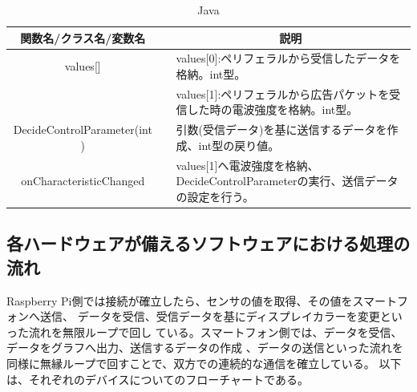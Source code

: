\documentclass[dvipdfmx,autodetect-engine,titlepage]{jsarticle}
\begin{document}
    \begin{table}[h]
        \centering
        \small
        \caption{Java}
        \begin{tabular}{cll}
        \hline
        関数名/クラス名/変数名                 &  & \multicolumn{1}{c}{説明}                                       \\ \hline\hline
        values{[}{]}                 &  & values{[}0{]}:ペリフェラルから受信したデータを格納。int型。                       \\ \hline
                                     &  & values{[}1{]}:ペリフェラルから広告パケットを受信した時の電波強度を格納。int型。             \\ \hline
        DecideControlParameter(int ) &  & 引数(受信データ)を基に送信するデータを作成、int型の戻り値。                             \\ \hline
        onCharacteristicChanged      &  & values{[}1{]}へ電波強度を格納、DecideControlParameterの実行、送信データの設定を行う。 \\ \hline
        \end{tabular}
        \end{table}

  \subsection{各ハードウェアが備えるソフトウェアにおける処理の流れ}
  Raspberry Pi側では接続が確立したら、センサの値を取得、その値をスマートフォンへ送信、
  データを受信、受信データを基にディスプレイカラーを変更といった流れを無限ループで回し
  ている。スマートフォン側では、データを受信、データをグラフへ出力、送信するデータの作成
  、データの送信といった流れを同様に無縁ループで回すことで、双方での連続的な通信を確立している。
  以下は、それぞれのデバイスについてのフローチャートである。
\end{document}
